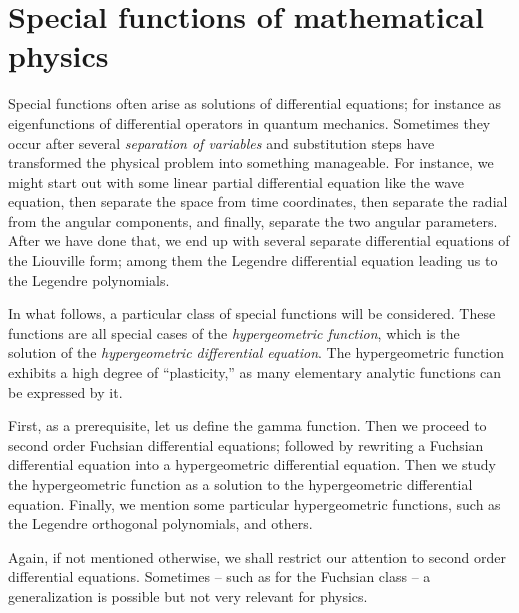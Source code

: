 \chapter{Special functions of mathematical physics}
\label{2011-m-ch-sf}


Special functions
often arise as solutions of differential equations; for instance as eigenfunctions
of differential operators in quantum mechanics.
Sometimes they occur  after several {\em separation of variables}
and substitution steps have transformed the physical problem into something manageable.
For instance, we might start out with some linear partial differential equation like the wave equation,
then separate the space from time coordinates,
then separate the radial from the angular components,
and finally, separate the two angular parameters.
After we have done that, we end up with several separate differential equations of the Liouville form;
among them the Legendre differential equation leading us to the Legendre polynomials.

In what follows, a particular class of special functions will be considered.
These functions are all special cases of the
{\em hypergeometric function},
which is the solution of the
{\em hypergeometric differential equation}.
The hypergeometric function exhibits a high degree of
``plasticity,''
as many elementary analytic functions can be expressed by it.

First, as a prerequisite, let us define the gamma function.
Then we proceed to second order Fuchsian differential equations;
followed by rewriting a Fuchsian  differential equation
into a hypergeometric differential equation.
Then we study the hypergeometric function as a solution to the
hypergeometric differential equation.
Finally, we mention some particular hypergeometric functions, such as the
Legendre orthogonal polynomials, and others.

Again, if not mentioned otherwise, we shall restrict our attention to
second order differential equations.
Sometimes -- such as for the Fuchsian class -- a generalization is possible but
not very relevant for physics.

